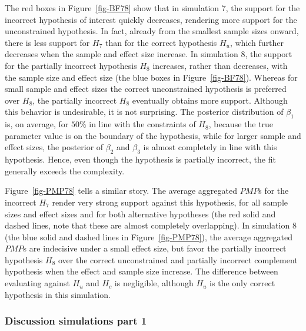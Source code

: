 \documentclass[
]{article}
\begin{document}
The red boxes in Figure~\ref{fig-BF78} show that in simulation 7, the
support for the incorrect hypothesis of interest quickly decreases,
rendering more support for the unconstrained hypothesis. In fact,
already from the smallest sample sizes onward, there is less support for
\(H_7\) than for the correct hypothesis \(H_u\), which further decreases
when the sample and effect size increase. In simulation 8, the support
for the partially incorrect hypothesis \(H_8\) increases, rather than
decreases, with the sample size and effect size (the blue boxes in
Figure~\ref{fig-BF78}). Whereas for small sample and effect sizes the
correct unconstrained hypothesis is preferred over \(H_8\), the
partially incorrect \(H_8\) eventually obtains more support. Although
this behavior is undesirable, it is not surprising. The posterior
distribution of \(\beta_1\) is, on average, for \(50\%\) in line with
the constraints of \(H_8\), because the true parameter value is on the
boundary of the hypothesis, while for larger sample and effect sizes,
the posterior of \(\beta_2\) and \(\beta_3\) is almost completely in
line with this hypothesis. Hence, even though the hypothesis is
partially incorrect, the fit generally exceeds the complexity.

Figure~\ref{fig-PMP78} tells a similar story. The average aggregated
\(PMP\)s for the incorrect \(H_7\) render very strong support against
this hypothesis, for all sample sizes and effect sizes and for both
alternative hypotheses (the red solid and dashed lines, note that these
are almost completely overlapping). In simulation 8 (the blue solid and
dashed lines in Figure~\ref{fig-PMP78}), the average aggregated \(PMP\)s
are indecisive under a small effect size, but favor the partially
incorrect hypothesis \(H_8\) over the correct unconstrained and
partially incorrect complement hypothesis when the effect and sample
size increase. The difference between evaluating against \(H_u\) and
\(H_c\) is negligible, although \(H_u\) is the only correct hypothesis
in this simulation.

\hypertarget{discussion-simulations-part-1}{%
\subsubsection{Discussion simulations part
1}\label{discussion-simulations-part-1}}
\end{document}
